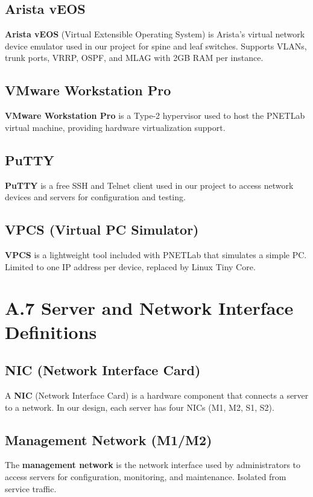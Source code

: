 \subsection*{Arista vEOS}
\label{def:veos}
\textbf{Arista vEOS} (Virtual Extensible Operating System) is Arista's virtual 
network device emulator used in our project for spine and leaf switches. 
Supports VLANs, trunk ports, VRRP, OSPF, and MLAG with 2GB RAM per instance.

\subsection*{VMware Workstation Pro}
\label{def:vmwareworkstation}
\textbf{VMware Workstation Pro} is a Type-2 hypervisor used to host the 
PNETLab virtual machine, providing hardware virtualization support.

\subsection*{PuTTY}
\label{def:putty}
\textbf{PuTTY} is a free SSH and Telnet client used in our project to access 
network devices and servers for configuration and testing.

\subsection*{VPCS (Virtual PC Simulator)}
\label{def:vpcs}
\textbf{VPCS} is a lightweight tool included with PNETLab that simulates a 
simple PC. Limited to one IP address per device, replaced by Linux Tiny Core.

\section*{A.7 Server and Network Interface Definitions}

\subsection*{NIC (Network Interface Card)}
\label{def:nic}
A \textbf{NIC} (Network Interface Card) is a hardware component that connects 
a server to a network. In our design, each server has four NICs (M1, M2, S1, S2).

\subsection*{Management Network (M1/M2)}
\label{def:management}
The \textbf{management network} is the network interface used by administrators 
to access servers for configuration, monitoring, and maintenance. Isolated 
from service traffic.

